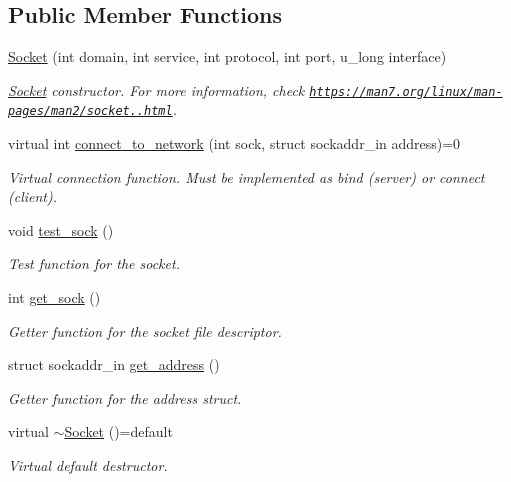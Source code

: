 \subsection*{Public Member Functions}
\begin{DoxyCompactItemize}
\item 
\hyperlink{classSocket_a8be4869e74ddaa7ca8b2a0002fe3ac8e}{Socket} (int domain, int service, int protocol, int port, u\+\_\+long interface)
\begin{DoxyCompactList}\small\item\em \hyperlink{classSocket}{Socket} constructor. For more information, check \href{https://man7.org/linux/man-pages/man2/socket.2.html}{\tt https\+://man7.\+org/linux/man-\/pages/man2/socket..\+html}. \end{DoxyCompactList}\item 
virtual int \hyperlink{classSocket_a2483ca0900b0d55cfeb4b6cf5724c1e7}{connect\+\_\+to\+\_\+network} (int sock, struct sockaddr\+\_\+in address)=0
\begin{DoxyCompactList}\small\item\em Virtual connection function. Must be implemented as bind (server) or connect (client). \end{DoxyCompactList}\item 
\mbox{\label{classSocket_a2a3fd953636d01a796d8b648c785d625}} 
void \hyperlink{classSocket_a2a3fd953636d01a796d8b648c785d625}{test\+\_\+sock} ()
\begin{DoxyCompactList}\small\item\em Test function for the socket. \end{DoxyCompactList}\item 
int \hyperlink{classSocket_a134a2436c9fff81048d7815eca284232}{get\+\_\+sock} ()
\begin{DoxyCompactList}\small\item\em Getter function for the socket file descriptor. \end{DoxyCompactList}\item 
struct sockaddr\+\_\+in \hyperlink{classSocket_a6a36bc269e33e3ffda2c224a9b8bf961}{get\+\_\+address} ()
\begin{DoxyCompactList}\small\item\em Getter function for the address struct. \end{DoxyCompactList}\item 
\mbox{\label{classSocket_a073b4b728d8b6e366db9caa37a59dbbb}} 
virtual \hyperlink{classSocket_a073b4b728d8b6e366db9caa37a59dbbb}{$\sim$\+Socket} ()=default
\begin{DoxyCompactList}\small\item\em Virtual default destructor. \end{DoxyCompactList}\end{DoxyCompactItemize}


